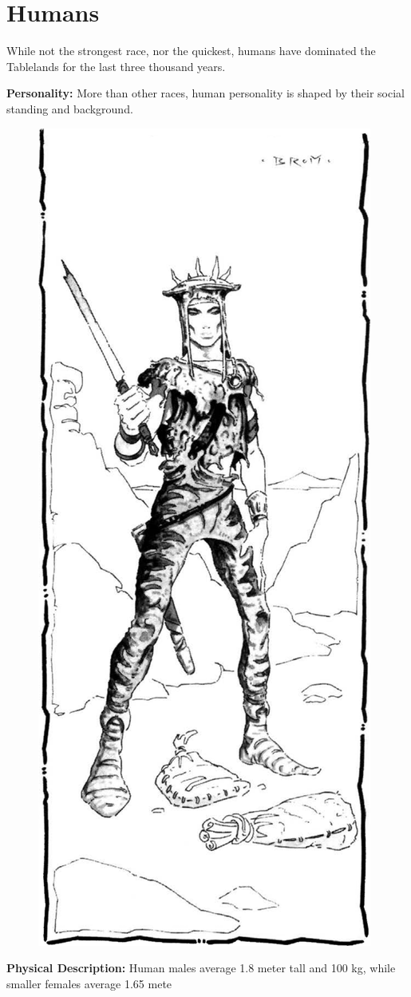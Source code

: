 \section{Humans}

While not the strongest race, nor the quickest, humans have dominated the Tablelands for the last three thousand years.

\textbf{Personality:} More than other races, human personality is shaped by their social standing and background.

\begin{figure}[t!]
\centering
\includegraphics[width=\columnwidth]{images/human-1.png}
\WOTC
\end{figure}

\textbf{Physical Description:} Human males average 1.8 meter tall and 100 kg, while smaller females average 1.65 mete